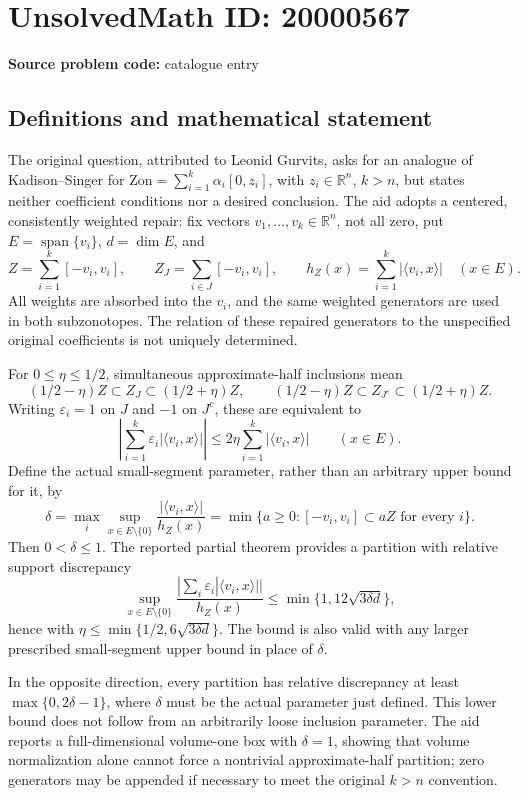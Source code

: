 \documentclass[11pt]{article}
\newcommand{\R}{\mathbb{R}}
\begin{document}
\section*{UnsolvedMath ID: 20000567}
\textbf{Source problem code:} catalogue entry
\subsection{Definitions and mathematical statement}
The original question, attributed to Leonid Gurvits, asks for an analogue of Kadison--Singer for \(\mathrm{Zon}=\sum_{i=1}^k\alpha_i[0,z_i]\), with \(z_i\in\R^n\), \(k>n\), but states neither coefficient conditions nor a desired conclusion. The aid adopts a centered, consistently weighted repair: fix vectors \(v_1,\ldots,v_k\in\R^n\), not all zero, put \(E=\operatorname{span}\{v_i\}\), \(d=\dim E\), and
\[
 Z=\sum_{i=1}^k[-v_i,v_i],\qquad Z_J=\sum_{i\in J}[-v_i,v_i],\qquad
 h_Z(x)=\sum_{i=1}^k|\langle v_i,x\rangle|\quad(x\in E).
\]
All weights are absorbed into the \(v_i\), and the same weighted generators are used in both subzonotopes. The relation of these repaired generators to the unspecified original coefficients is not uniquely determined.

For \(0\leq\eta\leq1/2\), simultaneous approximate-half inclusions mean
\[
 (1/2-\eta)Z\subset Z_J\subset(1/2+\eta)Z,\qquad
 (1/2-\eta)Z\subset Z_{J^c}\subset(1/2+\eta)Z.
\]
Writing \(\varepsilon_i=1\) on \(J\) and \(-1\) on \(J^c\), these are equivalent to
\[
 \left|\sum_{i=1}^k\varepsilon_i|\langle v_i,x\rangle|\right|
 \leq2\eta\sum_{i=1}^k|\langle v_i,x\rangle|\qquad(x\in E).
\]
Define the actual small-segment parameter, rather than an arbitrary upper bound for it, by
\[
 \delta=\max_i\sup_{x\in E\setminus\{0\}}
 \frac{|\langle v_i,x\rangle|}{h_Z(x)}
 =\min\{a\geq0:[-v_i,v_i]\subset aZ\text{ for every }i\}.
\]
Then \(0<\delta\leq1\). The reported partial theorem provides a partition with relative support discrepancy
\[
 \sup_{x\in E\setminus\{0\}}
 \frac{|\sum_i\varepsilon_i|\langle v_i,x\rangle||}{h_Z(x)}
 \leq\min\{1,12\sqrt{3\delta d}\},
\]
hence with \(\eta\leq\min\{1/2,6\sqrt{3\delta d}\}\). The bound is also valid with any larger prescribed small-segment upper bound in place of \(\delta\).

In the opposite direction, every partition has relative discrepancy at least \(\max\{0,2\delta-1\}\), where \(\delta\) must be the actual parameter just defined. This lower bound does not follow from an arbitrarily loose inclusion parameter. The aid reports a full-dimensional volume-one box with \(\delta=1\), showing that volume normalization alone cannot force a nontrivial approximate-half partition; zero generators may be appended if necessary to meet the original \(k>n\) convention.
\end{document}

